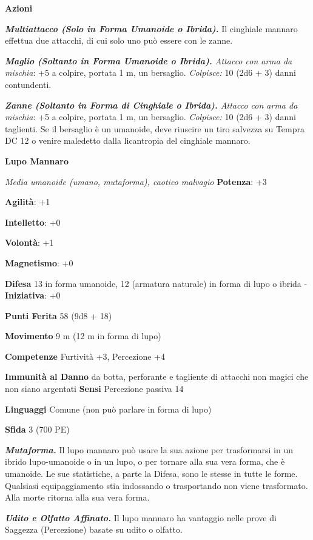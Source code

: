 \begin{multicols}{2}
\smallskip\textbf{Azioni}

\emph{\textbf{Multiattacco (Solo in Forma Umanoide o Ibrida).}} Il
cinghiale mannaro effettua due attacchi, di cui solo uno può essere con
le zanne.

\emph{\textbf{Maglio (Soltanto in Forma Umanoide o Ibrida).} Attacco con
arma da mischia}: +5 a colpire, portata 1 m, un bersaglio.
\emph{Colpisce:} 10 (2d6 + 3) danni contundenti.

\emph{\textbf{Zanne (Soltanto in Forma di Cinghiale o Ibrida).} Attacco
con arma da mischia}: +5 a colpire, portata 1 m, un bersaglio.
\emph{Colpisce:} 10 (2d6 + 3) danni taglienti. Se il bersaglio è un
umanoide, deve riuscire un tiro salvezza su Tempra DC 12 o venire
maledetto dalla licantropia del cinghiale mannaro.

\textbf{Lupo Mannaro}

\emph{Media umanoide (umano, mutaforma), caotico malvagio}
\textbf{Potenza}: +3

\textbf{Agilità}: +1

\textbf{Intelletto}: +0

\textbf{Volontà}: +1

\textbf{Magnetismo}: +0

\textbf{Difesa} 13 in forma umanoide, 12 (armatura naturale) in
forma di lupo o ibrida - \textbf{Iniziativa}: +0

\textbf{Punti Ferita} 58 (9d8 + 18)

\textbf{Movimento} 9 m (12 m in forma di lupo)

\textbf{Competenze} Furtività +3, Percezione +4

\textbf{Immunità al Danno} da botta, perforante e tagliente di
attacchi non magici che non siano argentati \textbf{Sensi} Percezione
passiva 14

\textbf{Linguaggi} Comune (non può parlare in forma di lupo)

\textbf{Sfida} 3 (700 PE)\smallskip

\emph{\textbf{Mutaforma.}} Il lupo mannaro può usare la sua azione per
trasformarsi in un ibrido lupo-umanoide o in un lupo, o per tornare alla
sua vera forma, che è umanoide. Le sue statistiche, a parte la Difesa, sono
le stesse in tutte le forme. Qualsiasi equipaggiamento stia indossando o
trasportando non viene trasformato. Alla morte ritorna alla sua vera
forma.

\emph{\textbf{Udito e Olfatto Affinato.}} Il lupo mannaro ha vantaggio
nelle prove di Saggezza (Percezione) basate su udito o olfatto.


\end{multicols}
